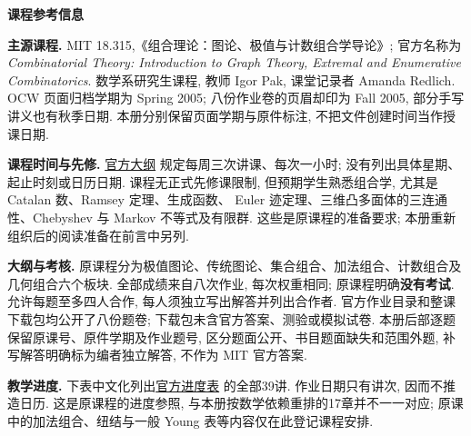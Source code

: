 {}
\begin{center}
{\color{structurecolor}\bfseries\fontsize{14.4}{20}\selectfont 课程参考信息\par}
\end{center}
\noindent\textbf{主源课程.}
MIT 18.315,《组合理论：图论、极值与计数组合学导论》;
官方名称为 \textit{Combinatorial Theory: Introduction to Graph Theory, Extremal and Enumerative Combinatorics}.
数学系研究生课程, 教师 Igor Pak, 课堂记录者 Amanda Redlich.
OCW 页面归档学期为 Spring 2005; 八份作业卷的页眉却印为 Fall 2005,
部分手写讲义也有秋季日期. 本册分别保留页面学期与原件标注,
不把文件创建时间当作授课日期.

\noindent\textbf{课程时间与先修.}
\href{https://ocw.mit.edu/courses/18-315-combinatorial-theory-introduction-to-graph-theory-extremal-and-enumerative-combinatorics-spring-2005/pages/syllabus/}{官方大纲}
规定每周三次讲课、每次一小时; 没有列出具体星期、起止时刻或日历日期.
课程无正式先修课限制, 但预期学生熟悉组合学, 尤其是 Catalan 数、Ramsey 定理、生成函数、
Euler 迹定理、三维凸多面体的三连通性、Chebyshev 与 Markov 不等式及有限群.
这些是原课程的准备要求; 本册重新组织后的阅读准备在前言中另列.

\noindent\textbf{大纲与考核.}
原课程分为极值图论、传统图论、集合组合、加法组合、计数组合及几何组合六个板块.
全部成绩来自八次作业, 每次权重相同; 原课程明确\textbf{没有考试}.
允许每题至多四人合作, 每人须独立写出解答并列出合作者.
官方作业目录和整课下载包均公开了八份题卷; 下载包未含官方答案、测验或模拟试卷.
本册后部逐题保留原课号、原件学期及作业题号, 区分题面公开、书目题面缺失和范围外题,
补写解答明确标为编者独立解答, 不作为 MIT 官方答案.

\noindent\textbf{教学进度.}
下表中文化列出\href{https://ocw.mit.edu/courses/18-315-combinatorial-theory-introduction-to-graph-theory-extremal-and-enumerative-combinatorics-spring-2005/pages/calendar/}{官方进度表}
的全部39讲. 作业日期只有讲次, 因而不推造日历.
这是原课程的进度参照, 与本册按数学依赖重排的17章并不一一对应;
原课中的加法组合、纽结与一般 Young 表等内容仅在此登记课程安排.

